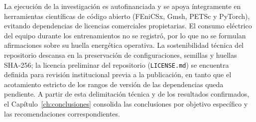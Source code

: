 La ejecución de la investigación es autofinanciada y se apoya íntegramente en herramientas científicas de código abierto (FEniCSx, Gmsh, PETSc y PyTorch), evitando dependencias de licencias comerciales propietarias. El consumo eléctrico del equipo durante los entrenamientos no se registró, por lo que no se formulan afirmaciones sobre su huella energética operativa. La sostenibilidad técnica del repositorio descansa en la preservación de configuraciones, semillas y huellas SHA-256; la licencia preliminar del repositorio (\texttt{LICENSE.md}) se encuentra definida para revisión institucional previa a la publicación, en tanto que el acotamiento estricto de los rangos de versión de las dependencias queda pendiente. A partir de esta delimitación técnica y de los resultados confirmados, el Capítulo~\ref{ch:conclusiones} consolida las conclusiones por objetivo específico y las recomendaciones correspondientes.
